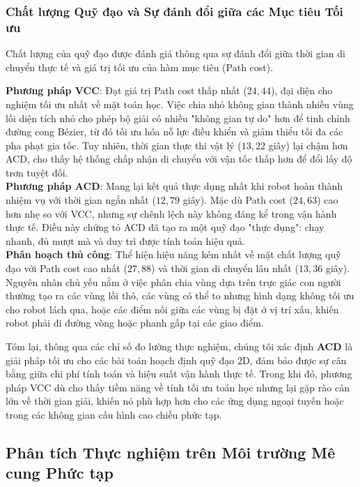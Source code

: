 \subsubsection{Chất lượng Quỹ đạo và Sự đánh đổi giữa các Mục tiêu Tối ưu}

Chất lượng của quỹ đạo được đánh giá thông qua sự đánh đổi giữa thời gian di chuyển thực tế và giá trị tối ưu của hàm mục tiêu (Path cost).

\textbf{Phương pháp VCC}: Đạt giá trị Path cost thấp nhất ($24,44$), đại diện cho nghiệm tối ưu nhất về mặt toán học. Việc chia nhỏ không gian thành nhiều vùng lồi diện tích nhỏ cho phép bộ giải có nhiều "không gian tự do" hơn để tinh chỉnh đường cong Bézier, từ đó tối ưu hóa nỗ lực điều khiển và giảm thiểu tối đa các pha phạt gia tốc. Tuy nhiên, thời gian thực thi vật lý ($13,22$ giây) lại chậm hơn ACD, cho thấy hệ thống chấp nhận di chuyển với vận tốc thấp hơn để đổi lấy độ trơn tuyệt đối. \\
\textbf{Phương pháp ACD}: Mang lại kết quả thực dụng nhất khi robot hoàn thành nhiệm vụ với thời gian ngắn nhất ($12,79$ giây). Mặc dù Path cost ($24,63$) cao hơn nhẹ so với VCC, nhưng sự chênh lệch này không đáng kể trong vận hành thực tế. Điều này chứng tỏ ACD đã tạo ra một quỹ đạo "thực dụng": chạy nhanh, đủ mượt mà và duy trì được tính toán hiệu quả. \\
\textbf{Phân hoạch thủ công}: Thể hiện hiệu năng kém nhất về mặt chất lượng quỹ đạo với Path cost cao nhất ($27,88$) và thời gian di chuyển lâu nhất ($13,36$ giây). Nguyên nhân chủ yếu nằm ở việc phân chia vùng dựa trên trực giác con người thường tạo ra các vùng lồi thô, các vùng có thể to nhưng hình dạng không tối ưu cho robot lách qua, hoặc các điểm nối giữa các vùng bị đặt ở vị trí xấu, khiến robot phải đi đường vòng hoặc phanh gấp tại các giao điểm.


Tóm lại, thông qua các chỉ số đo lường thực nghiệm, chúng tôi xác định \textbf{ACD} là giải pháp tối ưu cho các bài toán hoạch định quỹ đạo 2D, đảm bảo được sự cân bằng giữa chi phí tính toán và hiệu suất vận hành thực tế. Trong khi đó, phương pháp VCC dù cho thấy tiềm năng về tính tối ưu toán học nhưng lại gặp rào cản lớn về thời gian giải, khiến nó phù hợp hơn cho các ứng dụng ngoại tuyến hoặc trong các không gian cấu hình cao chiều phức tạp.

\subsection{Phân tích Thực nghiệm trên Môi trường Mê cung Phức tạp}


